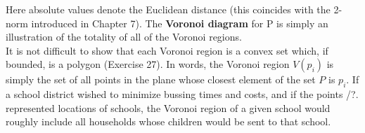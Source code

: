 \documentclass[../main.tex]{subfiles}
\begin{document}
Here absolute values denote the Euclidean distance (this coincides with the 2-norm introduced in Chapter 7). The \textbf{Voronoi diagram} for P is simply an illustration of the totality of all of the Voronoi regions.
\\

It is not difficult to show that each Voronoi region is a convex set which, if bounded, is a polygon (Exercise 27). In words, the Voronoi region $V(p_i)$ is simply the set of all points in the plane whose closest element of the set $P$ is $p_i$. If a school district wished to minimize bussing times and costs, and if the points /?. represented locations of schools, the Voronoi region of a given school would roughly include all households whose children would be sent to that school. 
\\
\end{document}
